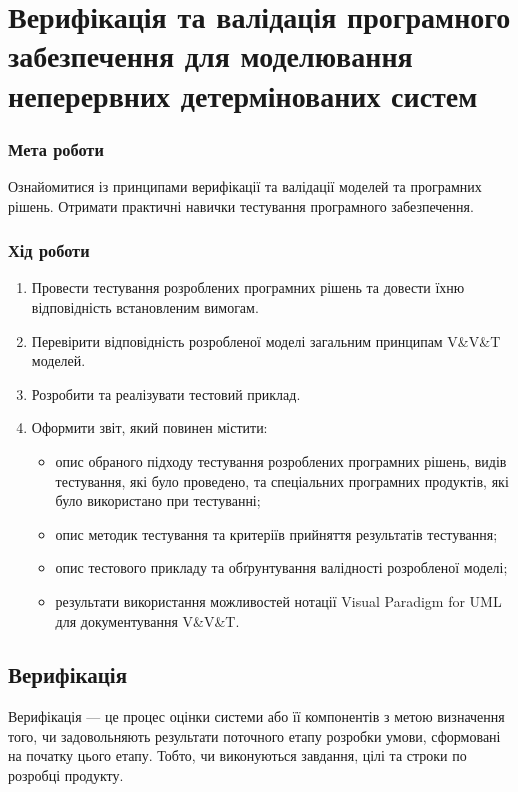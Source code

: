 



\newcommand{\labnumber}{5} %



\lstset{language=Kotlin}
\graphicspath{{figures/}}


\Ukrainian


\addtocounter{page}{1}

\section*{Верифікація та валідація програмного забезпечення для моделювання неперервних детермінованих систем}
\subsubsection*{Мета роботи}
Ознайомитися із принципами верифікації та валідації моделей та програмних рішень. 
Отримати практичні навички тестування програмного забезпечення.
\subsubsection*{Хід роботи}
\begin{enumerate}
\item Провести тестування розроблених програмних рішень та довести їхню відповідність встановленим вимогам.
\item Перевірити відповідність розробленої моделі загальним принципам V\&V\&T моделей.
\item Розробити та реалізувати тестовий приклад.
\item Оформити звіт, який повинен містити:
\begin{itemize}
\item опис обраного підходу тестування розроблених програмних рішень, видів тестування, які було проведено, та спеціальних програмних продуктів, які було використано при тестуванні;
\item опис методик тестування та критеріїв прийняття результатів тестування;
\item опис тестового прикладу та обґрунтування валідності розробленої моделі;
\item результати використання можливостей нотації Visual Paradigm for UML для документування V\&V\&T.
\end{itemize}
\end{enumerate}

\subsection{Верифікація}
Верифікація --- це процес оцінки системи або її компонентів з метою визначення того, чи задовольняють результати поточного етапу розробки умови, сформовані на початку цього етапу. 
Тобто, чи виконуються завдання, цілі та
строки по розробці продукту.

